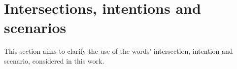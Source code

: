 
\section{Intersections, intentions and scenarios}
\label{sec:intro_intersections}
This section aims to clarify the use of the words' intersection, intention and scenario, considered in this work.


